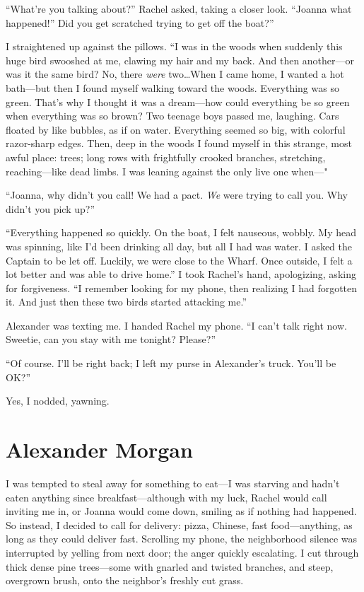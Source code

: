 ``What're you talking about?'' Rachel asked, taking a closer look.
``Joanna what happened!'' Did you get scratched trying to get off the
boat?''

I straightened up against the pillows. ``I was in the woods when
suddenly this huge bird swooshed at me, clawing my hair and my back. And
then another---or was it the same bird? No, there \emph{were}
two\ldots When I came home, I wanted a hot bath---but then I found
myself walking toward the woods. Everything was so green. That's why I
thought it was a dream---how could everything be so green when
everything was so brown? Two teenage boys passed me, laughing. Cars
floated by like bubbles, as if on water. Everything seemed so big, with
colorful razor-sharp edges. Then, deep in the woods I found myself in
this strange, most awful place: trees; long rows with frightfully
crooked branches, stretching, reaching---like dead limbs. I was leaning
against the only live one when---"

``Joanna, why didn't you call! We had a pact. \emph{We} were trying to
call you. Why didn't you pick up?''

``Everything happened so quickly. On the boat, I felt nauseous, wobbly.
My head was spinning, like I'd been drinking all day, but all I had was
water. I asked the Captain to be let off. Luckily, we were close to the
Wharf. Once outside, I felt a lot better and was able to drive home.'' I
took Rachel's hand, apologizing, asking for forgiveness. ``I remember
looking for my phone, then realizing I had forgotten it. And just then
these two birds started attacking me.''

Alexander was texting me. I handed Rachel my phone. ``I can't talk right
now. Sweetie, can you stay with me tonight? Please?''

``Of course. I'll be right back; I left my purse in Alexander's truck.
You'll be OK?''

Yes, I nodded, yawning.

\chapter{Alexander Morgan}

\titlemark

I was tempted to steal away for something to eat---I was starving and
hadn't eaten anything since breakfast---although with my luck, Rachel
would call inviting me in, or Joanna would come down, smiling as if
nothing had happened. So instead, I decided to call for delivery: pizza,
Chinese, fast food---anything, as long as they could deliver fast.
Scrolling my phone, the neighborhood silence was interrupted by yelling
from next door; the anger quickly escalating. I cut through thick dense
pine trees---some with gnarled and twisted branches, and steep,
overgrown brush, onto the neighbor's freshly cut grass.

